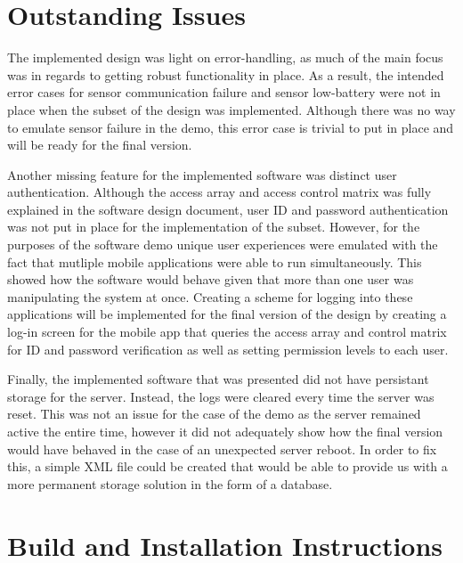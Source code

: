 \documentclass{article}
\begin{document}
\section{Outstanding Issues} %

The implemented design was light on error-handling, as much of the
main focus was in regards to getting robust functionality in place. As
a result, the intended error cases for sensor communication failure
and sensor low-battery were not in place when the subset of the design
was implemented. Although there was no way to emulate sensor failure
in the demo, this error case is trivial to put in place and will be
ready for the final version.

Another missing feature for the implemented software was distinct user
authentication. Although the access array and access control matrix was fully
explained in the software design document, user ID and password authentication
was not put in place for the implementation of the subset. However, for the
purposes of the software demo unique user experiences were emulated with the
fact that mutliple mobile applications were able to run simultaneously. This
showed how the software would behave given that more than one user was
manipulating the system at once. Creating a scheme for logging into these 
applications will be implemented for the final version of the design by 
creating a log-in screen for the mobile app that queries the access array
and control matrix for ID and password verification as well as setting permission
levels to each user.

Finally, the implemented software that was presented did not have persistant
storage for the server. Instead, the logs were cleared every time the server
was reset. This was not an issue for the case of the demo as the server remained
active the entire time, however it did not adequately show how the final version
would have behaved in the case of an unexpected server reboot. In order to fix
this, a simple XML file could be created that would be able to provide us with a
more permanent storage solution in the form of a database.

\section{Build and Installation Instructions}
\end{document}
